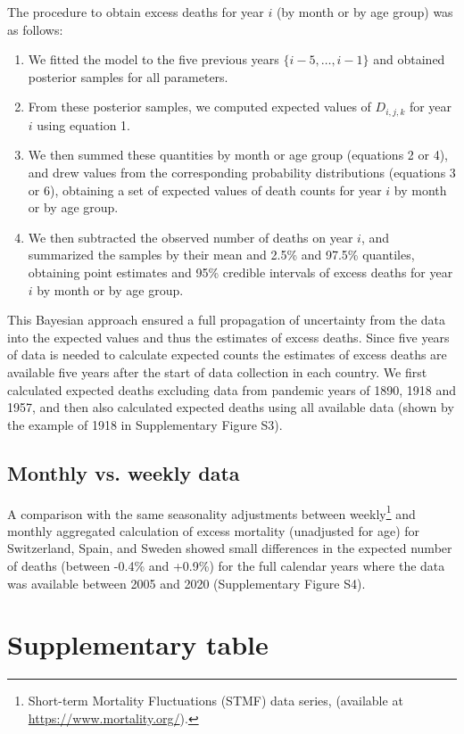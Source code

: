 \documentclass{article}
\begin{document}
	The procedure to obtain excess deaths for year $i$ (by month or by age group) was as follows:
	\begin{enumerate}
		\item We fitted the model to the five previous years $\{i-5,\ldots,i-1\}$ and obtained posterior samples for all parameters.
		\item From these posterior samples, we computed expected values of $D_{i,j,k}$ for year $i$ using equation 1.
		\item We then summed these quantities by month or age group (equations 2 or 4), and drew values from the corresponding probability distributions (equations 3 or 6), obtaining a set of expected values of death counts for year $i$ by month or by age group. 
		\item We then subtracted the observed number of deaths on year $i$, and summarized the samples by their mean and 2.5\% and 97.5\% quantiles, obtaining point estimates and 95\% credible intervals of excess deaths for year $i$ by month or by age group. 
	\end{enumerate} 
	This Bayesian approach ensured a full propagation of uncertainty from the data into the expected values and thus the estimates of excess deaths.
	Since five years of data is needed to calculate expected counts the estimates of excess deaths are available five years after the start of data collection in each country. We first calculated expected deaths excluding data from pandemic years of 1890, 1918 and 1957, and then also calculated expected deaths using all available data (shown by the example of 1918 in Supplementary Figure S3).

	\subsection{Monthly vs. weekly data}
	
	A comparison with the same seasonality adjustments between weekly\footnote{Short-term Mortality Fluctuations (STMF) data series, (available at \url{https://www.mortality.org/}).} and monthly aggregated calculation of excess mortality (unadjusted for age) for Switzerland, Spain, and Sweden showed small differences in the expected number of deaths (between -0.4\% and +0.9\%) for the full calendar years where the data was available between 2005 and 2020 (Supplementary Figure S4).	

	\section{Supplementary table}
	
\end{document}
